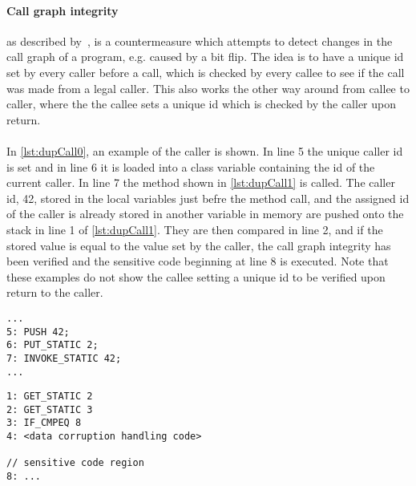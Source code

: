 \paragraph{Call graph integrity} as described by~\cite[p. 12]{javasec}, is a countermeasure which attempts to detect changes in the call graph of a program, e.g. caused by a bit flip. The idea is to have a unique id set by every caller before a call, which is checked by every callee to see if the call was made from a legal caller. This also works the other way around from callee to caller, where the the callee sets a unique id which is checked by the caller upon return.\\\\
In \cref{lst:dupCall0}, an example of the caller is shown. In line 5 the unique caller id is set and in line 6 it is loaded into a class variable containing the id of the current caller. In line 7 the method shown in \cref{lst:dupCall1} is called. The caller id, 42, stored in the local variables just befre the method call, and the assigned id of the caller is already stored in another variable in memory are pushed onto the stack in line 1 of \ref{lst:dupCall1}. They are then compared in line 2, and if the stored value is equal to the value set by the caller, the call graph integrity has been verified and the sensitive code beginning at line 8 is executed. Note that these examples do not show the callee setting a unique id to be verified upon return to the caller.
\begin{minipage}{\linewidth}
\begin{lstlisting}[caption={Caller with call graph integrity implemented. The code is written in \jcl. Note that for simplicity, the numbers in the left side are line numbers and do not denote the program counter values.}, label={lst:dupCall0}]
...
5: PUSH 42; 
6: PUT_STATIC 2;
7: INVOKE_STATIC 42;
...
\end{lstlisting}
\end{minipage}

\begin{minipage}{\linewidth}
\begin{lstlisting}[caption={Callee with call graph integrity implemented. The code is written in \jcl. Note that for simplicity, the numbers in the left side are line numbers and do not denote the program counter values.}, label={lst:dupCall0}]
1: GET_STATIC 2
2: GET_STATIC 3
3: IF_CMPEQ 8
4: <data corruption handling code>

// sensitive code region
8: ...
\end{lstlisting}
\end{minipage}